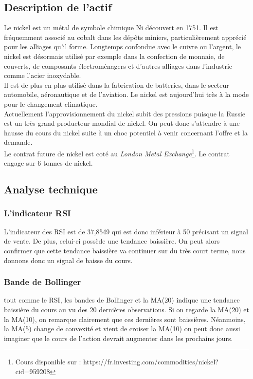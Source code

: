 \documentclass[12pt,a4paper]{article}
\begin{document}
\subsection{Description de l'actif}
Le nickel est un métal de symbole chimique Ni découvert en 1751. Il est fréquemment associé au cobalt dans les dépôts miniers, particulièrement apprécié pour les alliages 
qu'il forme. Longtemps confondue avec le cuivre ou l'argent, le nickel est désormais utilisé par exemple dans la confection de monnaie, de couverts, de composants 
électroménagers et d'autres alliages dans l'industrie comme l'acier inoxydable.\\
Il est de plus en plus utilisé dans la fabrication de batteries, dans le secteur automobile, aéronautique et de l'aviation. 
Le nickel est aujourd'hui très à la mode pour le changement climatique.\\
Actuellement l'approvisionnement du nickel subit des pressions puisque la Russie est un très grand producteur mondial de nickel. On peut donc s'attendre à une hausse du 
cours du nickel suite à un choc potentiel à venir concernant l'offre et la demande.\\
Le contrat future de nickel est coté au \textit{London Metal Exchange}\footnote{Cours disponible sur : https://fr.investing.com/commodities/nickel?cid=959208}. Le contrat 
engage sur 6 tonnes de nickel.\\[11pt]
\subsection{Analyse technique}
\subsubsection*{L'indicateur RSI}
L'indicateur des RSI est de 37,8549 qui est donc inférieur à 50 précisant un signal de vente. De plus, celui-ci possède une tendance baissière. On peut alors confirmer que 
cette tendance baissière va continuer sur du très court terme, nous donnons donc un signal de baisse du cours. 
\subsubsection*{Bande de Bollinger}
tout comme le RSI, les bandes de Bollinger et la MA(20) indique une tendance baissière du cours au vu des 20 dernières observations. 
Si on regarde la MA(20) et la MA(10), on remarque clairement que ces dernières sont baissières. Néanmoins, la MA(5) change de convexité et vient de croiser la MA(10) on 
peut donc aussi imaginer que le cours de l'action devrait augmenter dans les prochains jours.
\end{document}
